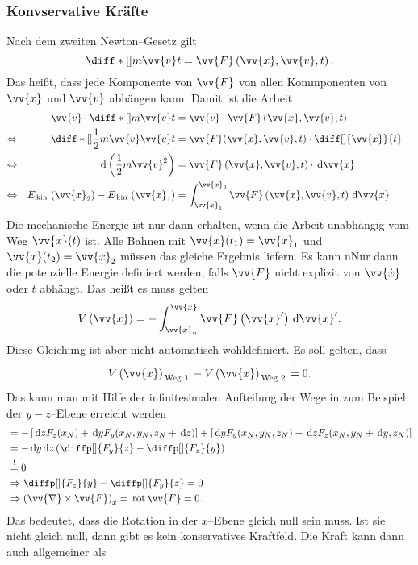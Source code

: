 \documentclass[a4paper,12pt]{article}
\newcommand{\td}{\,\text{d}}
\numberwithin{equation}{section}
\begin{document}
\subsubsection{Konvservative Kräfte}
Nach dem zweiten Newton--Gesetz gilt
\[ 
        \diff*[]{m\vv{v}}{t}=\vv{F}\left(\vv{x},\vv{v},t\right)
.\] 
Das heißt, dass jede Komponente von $\vv{F}$ von allen Kommponenten von $\vv{x}$ und $\vv{v}$ abhängen kann. Damit ist die Arbeit
\begin{align*}
        &&\vv{v}\cdot \diff*[]{m\vv{v}}{t}&=\vv{v}\cdot \vv{F}\left(\vv{x},\vv{v},t\right)&&\\
        \Leftrightarrow &&\diff*[]{\dfrac{1}{2}m\vv{v}\vv{v}}{t}&=\vv{F}(\vv{x},\vv{v},t)\cdot \diff[]{\vv{x}}{t}&&\\
        \Leftrightarrow &&\td \left(\dfrac{1}{2}m\vv{v}^2\right)&=\vv{F}\left(\vv{x},\vv{v},t\right)\cdot \td \vv{x}&&\\
        \Leftrightarrow &&E_{\,\text{kin}\,}\left(\vv{x}_2\right)-E_{\,\text{kin}\,}\left(\vv{x}_1\right)&=\int_{\vv{x}_1}^{\vv{x}_2}\vv{F}\left(\vv{x},\vv{v},t\right)\td \vv{x}
\end{align*}
Die mechanische Energie ist nur dann erhalten, wenn die Arbeit unabhängig vom Weg $\vv{x}(t)$ ist. Alle Bahnen mit $\vv{x}(t_1)=\vv{x}_1$ und $\vv{x}(t_2)=\vv{x}_2$ müssen das gleiche Ergebnis liefern. Es kann nNur dann die potenzielle Energie definiert werden, falls $\vv{F}$ nicht explizit von $\vv{\dot{x}}$ oder $t$ abhängt. Das heißt es muss gelten
\[ 
        V\left(\vv{x}\right)=-\int_{\vv{x}_n}^{\vv{x}}\vv{F}\left(\vv{x}'\right)\td \vv{x}'
.\] 
Diese Gleichung ist aber nicht automatisch wohldefiniert. Es soll gelten, dass
\[ 
        V\left(\vv{x}\right)_{\,\text{Weg 1}\,}-V\left(\vv{x}\right)_{\,\text{Weg 2}\,}\stackrel{!}{=}0
.\] 
Das kann man mit Hilfe der infinitesimalen Aufteilung der Wege in zum Beispiel der $y-z$--Ebene  erreicht werden
\begin{align*}
        &=-\left[\td zF_z(x_N)+\td yF_y(x_N,y_N,z_N+\td z)\right]+\left[\td yF_y(x_N,y_N,z_N)+\td zF_z(x_N,y_N+\td y,z_N)\right]\\
        &=-\td y\td z\left(\diffp[]{F_y}{z}-\diffp[]{F_z}{y}\right)\\
        &\stackrel{!}{=}0\\
        &\Rightarrow \diffp[]{F_z}{y}-\diffp[]{F_y}{z}=0\\
        &\Rightarrow \left(\vv{\nabla}\times \vv{F}\right)_x=\,\text{rot}\,\vv{F}=0
.\end{align*}
Das bedeutet, dass die Rotation in der $x$--Ebene gleich null sein muss. Ist sie nicht gleich null, dann gibt es kein konservatives Kraftfeld. Die Kraft kann dann auch allgemeiner als
\end{document}
